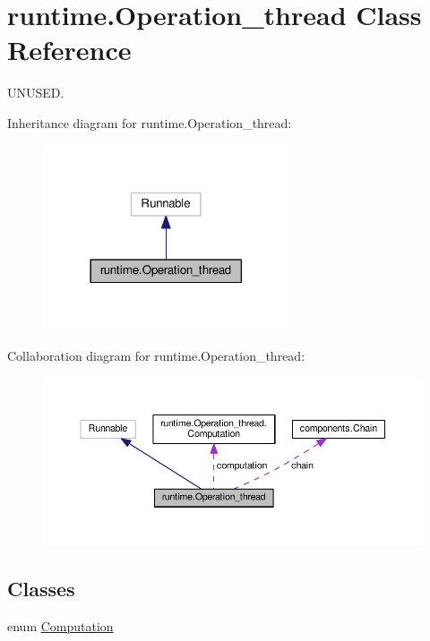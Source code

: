 \hypertarget{classruntime_1_1_operation__thread}{}\section{runtime.\+Operation\+\_\+thread Class Reference}
\label{classruntime_1_1_operation__thread}


U\+N\+U\+S\+ED.  




Inheritance diagram for runtime.\+Operation\+\_\+thread\+:\nopagebreak
\begin{figure}[H]
\begin{center}
\leavevmode
\includegraphics[width=206pt]{classruntime_1_1_operation__thread__inherit__graph}
\end{center}
\end{figure}


Collaboration diagram for runtime.\+Operation\+\_\+thread\+:\nopagebreak
\begin{figure}[H]
\begin{center}
\leavevmode
\includegraphics[width=350pt]{classruntime_1_1_operation__thread__coll__graph}
\end{center}
\end{figure}
\subsection*{Classes}
\begin{DoxyCompactItemize}
\item 
enum \hyperlink{enumruntime_1_1_operation__thread_1_1_computation}{Computation}
\end{DoxyCompactItemize}
